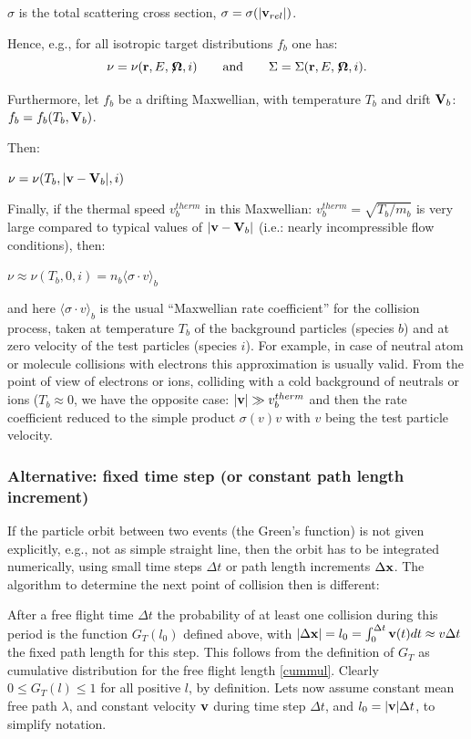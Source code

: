 $\sigma$ is the total scattering cross section, $\sigma = \sigma(|\mathbf{v}_{rel}|)$.

Hence, e.g., for all isotropic target distributions $f_b$ one has:
\begin{displaymath}
  \nu = \nu(\mathbf{r},E,\not\! \mathbf{\Omega},i) \qquad
  \mbox{and} \qquad \Sigma = \Sigma(\mathbf{r},E,\not\!\mathbf{\Omega},i).
\end{displaymath}

Furthermore, let $f_b$ be a drifting Maxwellian, with temperature $T_b$ and
drift $\mathbf{V}_b$: $f_b = f_b(T_b,\mathbf{V}_b)$.

Then:

$\nu = \nu(T_b,|\mathbf{v}-\mathbf{V}_b|,i)$ 

Finally, if the thermal speed $v_b^{therm}$ in this Maxwellian:
$v_b^{therm} = \sqrt{T_b/m_b}$ is very large compared to typical values of
$|\mathbf{v}-\mathbf{V}_b|$ (i.e.: nearly incompressible flow conditions), then:

$\nu \approx \nu(T_b,0,i) = n_b \langle\sigma \cdot v\rangle_b$

and here $\langle\sigma \cdot v\rangle_b$ is the usual ``Maxwellian rate
coefficient'' for the collision process, taken at temperature $T_b$ of the
background particles (species $b$) and at zero velocity of the test particles
(species $i$).
For example, in case of neutral atom or molecule collisions with electrons this
approximation is usually valid.
From the point of view of electrons or ions, colliding with a cold background
of neutrals or ions ($T_b\approx 0$, we have the opposite case: $|\mathbf{v}|\gg
  v_b^{therm}$ and then the rate coefficient reduced to the simple product
$\sigma(v) v$ with $v$ being the test particle velocity.

\subsubsection{Alternative: fixed time step (or constant path length increment)}

If the particle orbit between two events (the Green's function) is not given
explicitly, e.g., not as simple straight line, then the orbit has to be
integrated numerically, using small time steps $\Delta t$ or path length
increments $\Delta \mathbf{x}$.
The algorithm to determine the next point of collision then is different:

After a free flight  time  $\Delta t$ the probability of at least one collision
during this period is the function $G_T(l_0)$ defined above, with $|\Delta \mathbf{x}|
  = l_0 = \int_0^{\Delta t} \mathbf{v}(t) dt \approx v \Delta t$ the fixed path length
for this step.
This follows from the definition of $G_T$ as cumulative distribution for the
free flight length \cref{cummul}.
Clearly $0\le G_T(l) \le 1$ for all positive $l$, by definition.
Lets now assume constant mean free path $\lambda$, and constant velocity $\mathbf{v}$
during time step $\Delta t$, and $l_0=|\mathbf{v}| \Delta t$, to simplify notation.

